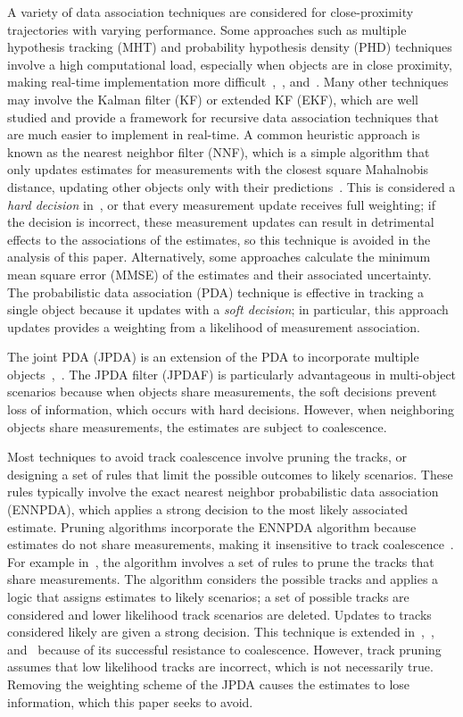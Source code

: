 \documentclass[letterpaper, 10pt, conference]{ieeeconf}
\begin{document}
A variety of data association techniques are considered for close-proximity trajectories with varying performance.
Some approaches such as multiple hypothesis tracking (MHT) and probability hypothesis density (PHD) techniques involve a high computational load, especially when objects are in close proximity, making real-time implementation more difficult~\cite{MHT1},~\cite{PHD1}, and~\cite{PHD2}.
Many other techniques may involve the Kalman filter (KF) or extended KF (EKF), which are well studied and provide a framework for recursive data association techniques that are much easier to implement in real-time.
A common heuristic approach is known as the nearest neighbor filter (NNF), which is a simple algorithm that only updates estimates for measurements with the closest square Mahalnobis distance, updating other objects only with their predictions~\cite{NN2}.
This is considered a \emph{hard decision} in~\cite{JPDAF1}, or that every measurement update receives full weighting; if the decision is incorrect, these measurement updates can result in detrimental effects to the associations of the estimates, so this technique is avoided in the analysis of this paper.
Alternatively, some approaches calculate the minimum mean square error (MMSE) of the estimates and their associated uncertainty.
The probabilistic data association (PDA) technique is effective in tracking a single object because it updates with a \emph{soft decision}; in particular, this approach updates provides a weighting from a likelihood of measurement association.

The joint PDA (JPDA) is an extension of the PDA to incorporate multiple objects~\cite{JPDAF1},~\cite{TrackDataAssoc}.
The JPDA filter (JPDAF) is particularly advantageous in multi-object scenarios because when objects share measurements, the soft decisions prevent loss of information, which occurs with hard decisions.
However, when neighboring objects share measurements, the estimates are subject to coalescence.

Most techniques to avoid track coalescence involve pruning the tracks, or designing a set of rules that limit the possible outcomes to likely scenarios. These rules typically involve the exact nearest neighbor probabilistic data association (ENNPDA), which applies a strong decision to the most likely associated estimate. Pruning algorithms incorporate the ENNPDA algorithm because  estimates do not share measurements, making it insensitive to track coalescence~\cite{Coal1}. For example in~\cite{Fitzgerald}, the algorithm involves a set of rules to prune the tracks that share measurements. The algorithm considers the possible tracks and applies a logic that assigns estimates to likely scenarios; a set of possible tracks are considered and lower likelihood track scenarios are deleted. Updates to tracks considered likely are given a strong decision. This technique is extended in~\cite{Coal_d},~\cite{Coal_e}, and~\cite{Coal_c} because of its successful resistance to coalescence. However, track pruning assumes that low likelihood tracks are incorrect, which is not necessarily true. Removing the weighting scheme of the JPDA causes the estimates to lose information, which this paper seeks to avoid.
\end{document}
